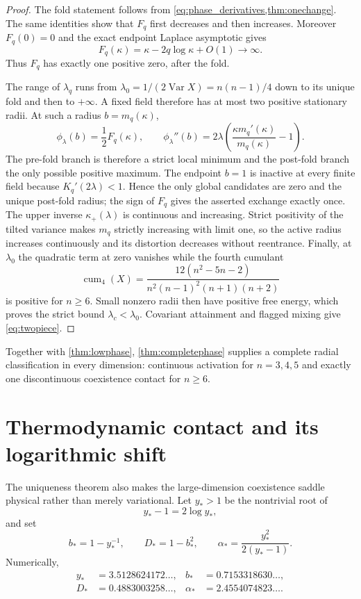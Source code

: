 \documentclass[11pt,a4paper]{article}
\DeclareMathOperator{\Var}{Var}
\DeclareMathOperator{\cum}{cum}
\begin{document}
\begin{proof}
The fold statement follows from \cref{eq:phase_derivatives,thm:onechange}.
The same identities show that $F_q$ first decreases and then increases.
Moreover $F_q(0)=0$ and the exact endpoint Laplace asymptotic gives
\[
 F_q(\kappa)=\kappa-2q\log\kappa+O(1)\longrightarrow\infty.
\]
Thus $F_q$ has exactly one positive zero, after the fold.

The range of $\lambda_q$ runs from
$\lambda_0=1/(2\Var X)=n(n-1)/4$ down to its unique fold and then to
$+\infty$.  A fixed field therefore has at most two positive stationary
radii.  At such a radius $b=m_q(\kappa)$,
\[
 \phi_\lambda(b)=\frac12F_q(\kappa),\qquad
 \phi_\lambda''(b)=2\lambda
 \left(\frac{\kappa m_q'(\kappa)}{m_q(\kappa)}-1\right).
\]
The pre-fold branch is therefore a strict local minimum and the post-fold
branch the only possible positive maximum.  The endpoint $b=1$ is inactive at
every finite field because $K_q'(2\lambda)<1$.  Hence the only global
candidates are zero and the unique post-fold radius; the sign of $F_q$ gives
the asserted exchange exactly once.  The upper inverse
$\kappa_+(\lambda)$ is continuous and increasing.  Strict positivity of the
tilted variance makes $m_q$ strictly increasing with limit one, so the active
radius increases continuously and its distortion decreases without
reentrance.  Finally, at $\lambda_0$ the quadratic term at zero vanishes while
the fourth cumulant
\[
 \cum_4(X)=\frac{12(n^2-5n-2)}
 {n^2(n-1)^2(n+1)(n+2)}
\]
is positive for $n\ge6$.  Small nonzero radii then have positive free energy,
which proves the strict bound $\lambda_c<\lambda_0$.  Covariant attainment and
flagged mixing give \cref{eq:twopiece}.
\end{proof}

Together with \cref{thm:lowphase}, \cref{thm:completephase} supplies a
complete radial classification in every dimension: continuous activation for
$n=3,4,5$ and exactly one discontinuous coexistence contact for $n\ge6$.

\section{Thermodynamic contact and its logarithmic shift}

The uniqueness theorem also makes the large-dimension coexistence saddle
physical rather than merely variational.  Let $y_*>1$ be the nontrivial root
of
\begin{equation}\label{eq:ystar}
 y_*-1=2\log y_*,
\end{equation}
and set
\[
 b_*=1-y_*^{-1},\qquad D_*=1-b_*^2,\qquad
 \alpha_*=\frac{y_*^2}{2(y_*-1)}.
\]
Numerically,
\begin{align*}
 y_*&=3.5128624172\ldots,& b_*&=0.7153318630\ldots,\\
 D_*&=0.4883003258\ldots,& \alpha_*&=2.4554074823\ldots.
\end{align*}
\end{document}
